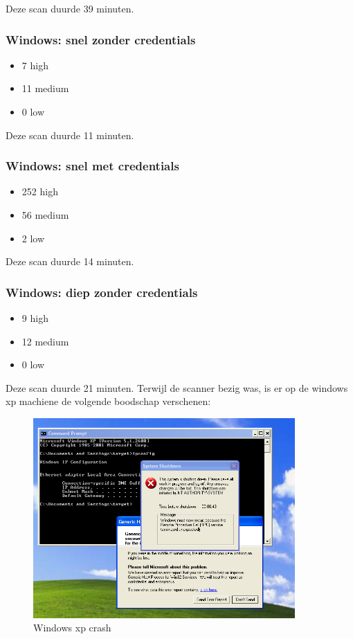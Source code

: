 Deze scan duurde 39 minuten.

\subsubsection{Windows: snel zonder credentials}

\begin{itemize}
\item 7 high
\item 11 medium
\item 0 low
\end{itemize}

Deze scan duurde 11 minuten.

\subsubsection{Windows: snel met credentials}

\begin{itemize}
\item 252 high
\item 56 medium
\item 2 low
\end{itemize}

Deze scan duurde 14 minuten.

\subsubsection{Windows: diep zonder credentials}

\begin{itemize}
\item 9 high
\item 12 medium
\item 0 low
\end{itemize}

Deze scan duurde 21 minuten. Terwijl de scanner bezig was, is er op de windows xp machiene de volgende boodschap verschenen: 


\begin{figure}[h]
\caption{Windows xp crash}
\includegraphics[width=10.0cm]{img/openvas-full.png}
\end{figure}


